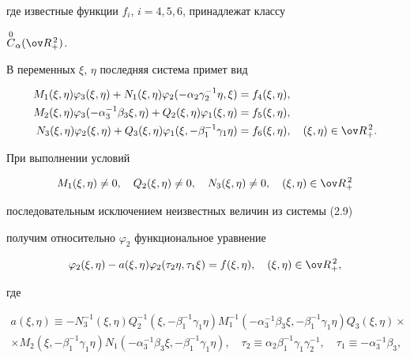 где известные функции $f_i$, $i=4,5,6$, принадлежат классу


$\OC_\alpha(\ov R^{\,2}_+)$.





В переменных $\xi$, $\eta$ последняя система примет вид


\begin{align}


M_1(\xi,\eta)\varphi_3(\xi,\eta)+N_1(\xi,\eta)


\varphi_2(-\alpha_2\gamma^{-1}_2\eta,\xi)&=f_4(\xi,\eta),\notag \\


M_2(\xi,\eta)\varphi_3(-\alpha^{-1}_3\beta_3\xi,\eta)+Q_2


(\xi,\eta)\varphi_1(\xi,\eta)&=f_5(\xi,\eta),\\


N_3(\xi,\eta)\varphi_2(\xi,\eta)+Q_3(\xi,\eta)


\varphi_1(\xi,-\beta^{-1}_1\gamma_1\eta)&=f_6(\xi,\eta),\quad


(\xi,\eta)\in\ov R^{\,2}_+.\notag


\end{align}





При выполнении условий


\begin{equation}


M_1(\xi,\eta)\ne 0,\quad Q_2(\xi,\eta)\ne 0,\quad


N_3(\xi,\eta)\ne 0,\quad (\xi,\eta)\in\ov R^{\,2}_+


\end{equation}


последовательным исключением неизвестных величин из системы (2.9)


получим относительно $\varphi_2$ функциональное уравнение


\begin{equation}


\varphi_2(\xi,\eta)-a(\xi,\eta)\varphi_2(\tau_2\eta,\tau_1\xi)=


f(\xi,\eta),\quad (\xi,\eta)\in\ov R^{\,2}_+,


\end{equation}


где


\begin{multline*}


a(\xi,\eta)\equiv-N^{-1}_3(\xi,\eta)Q^{-1}_2


(\xi,-\beta^{-1}_1\gamma_1\eta)M^{-1}_1


(-\alpha^{-1}_3\beta_3\xi,-\beta^{-1}_1\gamma_1\eta)


Q_3(\xi,\eta)\times \\


\times M_2(\xi,-\beta^{-1}_1\gamma_1\eta)


N_1(-\alpha^{-1}_3\beta_3\xi,-\beta^{-1}_1\gamma_1\eta),


\quad \tau_2\equiv\alpha_2\beta^{-1}_1\gamma_1\gamma^{-1}_2,\quad


\tau_1\equiv-\alpha^{-1}_3\beta_3,


\end{multline*}


